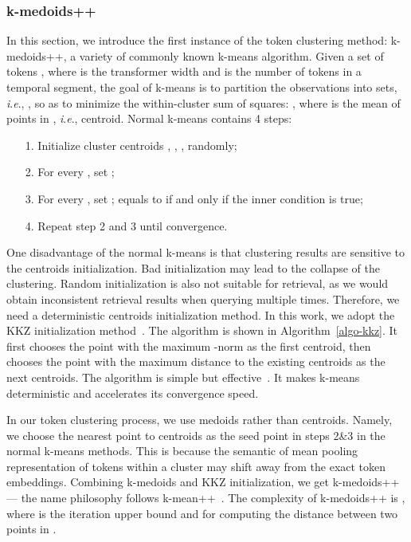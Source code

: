 \documentclass[sigconf]{acmart}
\newcommand{\ie}{\textit{i}.\textit{e}.}
\begin{document}
\subsubsection{\textbf{k-medoids++}}
In this section,
we introduce the first instance of the token clustering method: k-medoids++,
a variety of commonly known k-means algorithm.
Given a set of tokens ,
where  is the transformer width and 
is the number of tokens in a temporal segment,
the goal of k-means is to partition the  observations into  sets,
\ie, ,
so as to minimize the within-cluster sum of squares:
,
where  is the mean of points in , \ie, centroid.
Normal k-means contains 4 steps:
\begin{itemize}
\item[1.] Initialize cluster centroids , , ,   randomly;
\item[2.] For every , set ;
\item[3.] For every , set ;  equals to  if and only if the inner condition is true;
\item[4.] Repeat step 2 and 3 until convergence.
\end{itemize}

One disadvantage of the normal
k-means is that clustering results
are sensitive to the centroids initialization.
Bad initialization may lead to the collapse of the clustering.
Random initialization is also not suitable for retrieval,
as we would obtain inconsistent retrieval
results when querying multiple times. 
Therefore, we need a deterministic centroids initialization method.
In this work, we adopt the KKZ initialization
method~\cite{1994_KKZ, DBLP:journals/ida/SuD07}.
The algorithm is shown in Algorithm~\ref{algo-kkz}.
It first chooses the point with the maximum -norm as the first centroid,
then chooses the point with the maximum distance to the existing centroids
as the next centroids.
The algorithm is simple but effective~\cite{1994_KKZ, DBLP:journals/ida/SuD07}.
It makes k-means deterministic and accelerates its convergence speed.

In our token clustering process, we use medoids rather than centroids.
Namely, we choose the nearest point to centroids as the seed point in
steps 2\&3 in the normal k-means methods.
This is because the semantic of mean pooling
representation of tokens within a cluster may shift away
from the exact token embeddings.
Combining k-medoids and KKZ initialization,
we get k-medoids++ --- the name philosophy follows k-mean++~\cite{DBLP:conf/soda/ArthurV07}.
The complexity of k-medoids++ is ,
where  is the iteration upper bound
and  for computing the distance between two points in .
\end{document}
